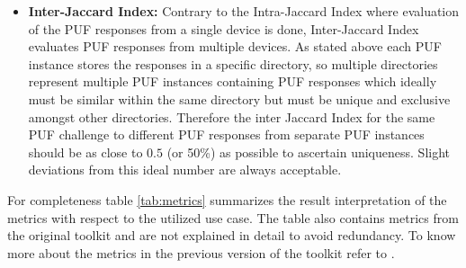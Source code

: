 \begin{itemize}
	\item \textbf{Inter-Jaccard Index:} Contrary to the Intra-Jaccard Index where evaluation of the PUF responses from a single device is done, Inter-Jaccard Index evaluates PUF responses from multiple devices. As stated above each PUF instance stores the responses in a specific directory, so multiple directories represent multiple PUF instances containing PUF responses which ideally must be similar within the same directory but must be unique and exclusive amongst other directories.
		Therefore the inter Jaccard Index for the same PUF challenge to different PUF responses from
		separate PUF instances should be as close to $0.5$ (or 50\%) as possible to ascertain
		uniqueness. Slight deviations from this ideal number are always acceptable.
\end{itemize}

For completeness table \ref{tab:metrics} summarizes the result interpretation of the metrics with respect to the utilized use case. The table also contains metrics from the original toolkit and are not explained in detail to avoid redundancy. To know more about the metrics in the previous version of the toolkit refer to \cite{71}.\\

